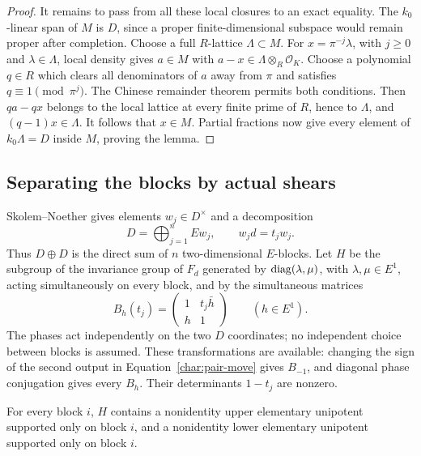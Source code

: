 \begin{proof}
It remains to pass from all these local closures to an exact equality.
The $k_0$-linear span of $M$ is $D$, since a proper finite-dimensional
subspace would remain proper after completion. Choose a full
$R$-lattice $\Lambda\subset M$. For $x=\pi^{-j}\lambda$, with
$j\geq0$ and $\lambda\in\Lambda$, local density gives $a\in M$ with
$a-x\in\Lambda\otimes_R\mathcal O_K$. Choose a polynomial $q\in R$
which clears all denominators of $a$ away from $\pi$ and satisfies
$q\equiv1\pmod{\pi^j}$. The Chinese remainder theorem permits both
conditions. Then $qa-qx$ belongs to the local lattice at every finite
prime of $R$, hence to $\Lambda$, and $(q-1)x\in\Lambda$.
It follows that $x\in M$. Partial fractions now give every element of
$k_0\Lambda=D$ inside $M$, proving the lemma.
\end{proof}

\subsection{Separating the blocks by actual shears}

Skolem--Noether gives elements $w_j\in D^\times$ and a decomposition
\[
 D=\bigoplus_{j=1}^n E w_j,\qquad w_jd=t_jw_j.
\]
Thus $D\oplus D$ is the direct sum of $n$ two-dimensional $E$-blocks.
Let $H$ be the subgroup of the invariance group of $F_d$ generated by
$\operatorname{diag}(\lambda,\mu)$, with $\lambda,\mu\in E^1$, acting
simultaneously on every block, and by the simultaneous matrices
\begin{equation}\label{char:boosts}
 B_h(t_j)=\begin{pmatrix}1&t_j\bar h\\h&1\end{pmatrix}
 \qquad(h\in E^1).
\end{equation}
The phases act independently on the two $D$ coordinates; no independent
choice between blocks is assumed. These transformations are available:
changing the sign of the second
output in Equation~\ref{char:pair-move} gives $B_{-1}$, and diagonal
phase conjugation gives every $B_h$. Their determinants $1-t_j$ are
nonzero.

\begin{lemma}\label{char:supported-shears}
For every block $i$, $H$ contains a nonidentity upper elementary
unipotent supported only on block $i$, and a nonidentity lower
elementary unipotent supported only on block $i$.
\end{lemma}

